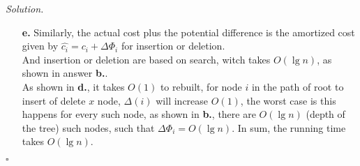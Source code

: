 \documentclass[11pt]{article}
\theoremstyle{definition}
\newenvironment{solution}{\noindent\emph{Solution.}}{\hfill$\square$}
\newcommand\tab[1][1cm]{\hspace*{#1}}
\begin{document}
\begin{solution}
\begin{enumerate}
  \item[\textbf{e.}] Similarly, the actual cost plus the potential difference is the amortized cost given by $\widehat{c_i} = c_i + \Delta\Phi_i$ for insertion or deletion.\\ \tab And insertion or deletion are based on search, witch takes $O(\lg n)$, as shown in answer \textbf{b.}.\\
 \tab As shown in \textbf{d.}, it takes $O(1)$ to rebuilt, for node $i$ in the path of root to insert of delete $x$ node, $\Delta(i)$ will increase $O(1)$, the worst case is this happens for every such node, as shown in \textbf{b.}, there are $O(\lg n)$ (depth of the tree) such nodes, such that $\Delta\Phi_i= O(\lg n)$. In sum, the running time takes $O(\lg n)$.

\end{enumerate}


\end{solution}
\end{document}
